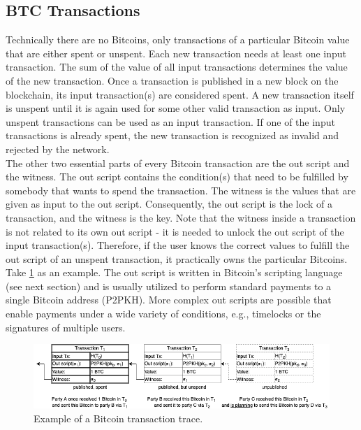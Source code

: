 \documentclass{cacthesis}
\begin{document}
        \subsection{BTC Transactions}
        Technically there are no Bitcoins, only transactions of a particular Bitcoin value that are either spent or unspent. Each new transaction needs at least one input transaction. The sum of the value of all input transactions determines the value of the new transaction. Once a transaction is published in a new block on the blockchain, its input transaction(s) are considered spent. A new transaction itself is unspent until it is again used for some other valid transaction as input. Only unspent transactions can be used as an input transaction. If one of the input transactions is already spent, the new transaction is recognized as invalid and rejected by the network. \\
        The other two essential parts of every Bitcoin transaction are the out script and the witness. The out script contains the condition(s) that need to be fulfilled by somebody that wants to spend the transaction. The witness is the values that are given as input to the out script. Consequently, the out script is the lock of a transaction, and the witness is the key. Note that the witness inside a transaction is not related to its own out script - it is needed to unlock the out script of the input transaction(s). Therefore, if the user knows the correct values to fulfill the out script of an unspent transaction, it practically owns the particular Bitcoins. Take \ref{fig:tx1} as an example. The out script is written in Bitcoin's scripting language (see next section) and is usually utilized to perform standard payments to a single Bitcoin address (P2PKH). More complex out scripts are possible that enable payments under a wide variety of conditions, e.g., timelocks or the signatures of multiple users.
        \begin{figure}
          \includegraphics[width=\linewidth]{images/basic_transaction_figure.png}
          \caption{Example of a Bitcoin transaction trace.}
          \label{fig:tx1}
        \end{figure}
\end{document}
